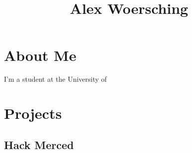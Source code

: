 \documentclass[letterpaper, 12pt]{article}
\title{Alex Woersching}
\date{}
\begin{document}
\maketitle
\section{About Me}
\par I'm a student at the University of \blindtext
\section{Projects}
\subsection{Hack Merced}
\blindtext
\end{document}
